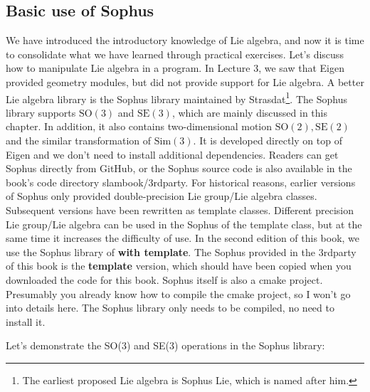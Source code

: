 \subsection{Basic use of Sophus}

We have introduced the introductory knowledge of Lie algebra, and now it is time to consolidate what we have learned through practical exercises. Let's discuss how to manipulate Lie algebra in a program. In Lecture 3, we saw that Eigen provided geometry modules, but did not provide support for Lie algebra. A better Lie algebra library is the Sophus library maintained by Strasdat\footnote{The earliest proposed Lie algebra is Sophus Lie, which is named after him. }. The Sophus library supports $\mathrm{SO}(3)$ and $\mathrm{SE}(3)$, which are mainly discussed in this chapter. In addition, it also contains two-dimensional motion $\mathrm{SO}(2), \mathrm{SE} (2) $ and the similar transformation of $\mathrm{Sim}(3)$. It is developed directly on top of Eigen and we don't need to install additional dependencies. Readers can get Sophus directly from GitHub, or the Sophus source code is also available in the book's code directory slambook/3rdparty. For historical reasons, earlier versions of Sophus only provided double-precision Lie group/Lie algebra classes. Subsequent versions have been rewritten as template classes. Different precision Lie group/Lie algebra can be used in the Sophus of the template class, but at the same time it increases the difficulty of use. In the second edition of this book, we use the Sophus library of \textbf{with template}. The Sophus provided in the 3rdparty of this book is the \textbf{template} version, which should have been copied when you downloaded the code for this book. Sophus itself is also a cmake project. Presumably you already know how to compile the cmake project, so I won't go into details here. The Sophus library only needs to be compiled, no need to install it.

Let's demonstrate the SO(3) and SE(3) operations in the Sophus library:


